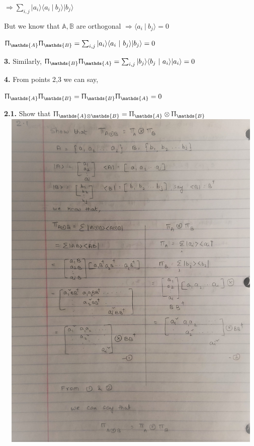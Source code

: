 \documentclass [12pt]{article}
\theoremstyle{definition}
\newcommand{\ket}[1]{| {#1} \rangle}
\newcommand{\braket}[2]{\langle #1 \ | \ #2 \rangle}
\begin{document}
\phantom{1000em} $\Rightarrow \sum_{i,j}\ket{a_{i}}\braket{a_{i}}{b_{j}}\ket{b_{j}}$

\phantom{1000em} But we know that $\mathds{A}, \mathds{B}$ are orthogonal $\Rightarrow \braket{a_{i}}{b_{j}} = 0$

\phantom{1000em} $\Uppi_{\mathds{A}}\Uppi_{\mathds{B}} = \sum_{i,j}\ket{a_{i}}\braket{a_{i}}{b_{j}}\ket{b_{j}} = 0$

\phantom{1em} {\bf 3.} Similarly, $\Uppi_{\mathds{B}}\Uppi_{\mathds{A}} = \sum_{i,j}\ket{b_{j}}\braket{b_{j}}{a_{i}}\ket{a_{i}} = 0$

\phantom{1em} {\bf 4.} From points 2,3 we can say,

\phantom{1000em} $\Uppi_{\mathds{A}}\Uppi_{\mathds{B}} = \Uppi_{\mathds{B}}\Uppi_{\mathds{A}} = 0$
 
\newpage
 
{\bf 2.1.} Show that $\Uppi_{\mathds{A} \otimes \mathds{B}} = \Uppi_{\mathds{A}} \otimes \Uppi_{\mathds{B}}$\\
\phantom{10em}\includegraphics[width=17cm, height=17cm]{I1} 
\end{document}
